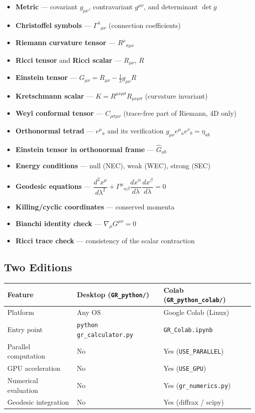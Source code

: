 \documentclass[11pt,a4paper]{article}
\newcommand{\code}[1]{\texttt{\small#1}}
\renewcommand{\Gamma}{\varGamma}
\begin{document}
\begin{itemize}
  \item \textbf{Metric} — covariant $g_{\mu\nu}$, contravariant $g^{\mu\nu}$,
        and determinant $\det g$
  \item \textbf{Christoffel symbols} — $\Gamma^\lambda{}_{\mu\nu}$
        (connection coefficients)
  \item \textbf{Riemann curvature tensor} — $R^\rho{}_{\sigma\mu\nu}$
  \item \textbf{Ricci tensor} and \textbf{Ricci scalar} — $R_{\mu\nu}$, $R$
  \item \textbf{Einstein tensor} — $G_{\mu\nu} = R_{\mu\nu} - \tfrac{1}{2}g_{\mu\nu}R$
  \item \textbf{Kretschmann scalar} — $K = R^{\mu\nu\rho\sigma}R_{\mu\nu\rho\sigma}$
        (curvature invariant)
  \item \textbf{Weyl conformal tensor} — $C_{\rho\sigma\mu\nu}$
        (trace-free part of Riemann, 4D only)
  \item \textbf{Orthonormal tetrad} — $e^\mu{}_a$ and its verification
        $g_{\mu\nu}e^\mu{}_a e^\nu{}_b = \eta_{ab}$
  \item \textbf{Einstein tensor in orthonormal frame} — $\hat{G}_{ab}$
  \item \textbf{Energy conditions} — null (NEC), weak (WEC), strong (SEC)
  \item \textbf{Geodesic equations} —
        $\dfrac{d^2x^\mu}{d\lambda^2} + \Gamma^\mu{}_{\alpha\beta}
         \dfrac{dx^\alpha}{d\lambda}\dfrac{dx^\beta}{d\lambda} = 0$
  \item \textbf{Killing/cyclic coordinates} — conserved momenta
  \item \textbf{Bianchi identity check} — $\nabla_\mu G^{\mu\nu} = 0$
  \item \textbf{Ricci trace check} — consistency of the scalar contraction
\end{itemize}

\subsection*{Two Editions}

\begin{center}
\begin{tabular}{lll}
  \toprule
  Feature & Desktop (\code{GR\_python/}) & Colab (\code{GR\_python\_colab/}) \\
  \midrule
  Platform  & Any OS & Google Colab (Linux) \\
  Entry point & \code{python gr\_calculator.py} & \code{GR\_Colab.ipynb} \\
  Parallel computation & No & Yes (\code{USE\_PARALLEL}) \\
  GPU acceleration & No & Yes (\code{USE\_GPU}) \\
  Numerical evaluation & No & Yes (\code{gr\_numerics.py}) \\
  Geodesic integration & No & Yes (diffrax / scipy) \\
  \bottomrule
\end{tabular}
\end{center}
\end{document}
